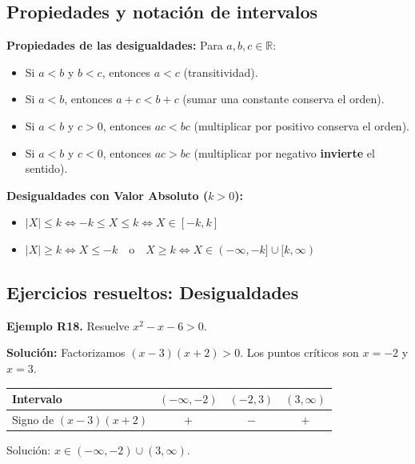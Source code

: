 \documentclass[12pt, letterpaper]{article}
\begin{document}
\subsection{Propiedades y notación de intervalos}

\begin{cuadroteoria}
      \textbf{Propiedades de las desigualdades:} Para $a, b, c \in \mathbb{R}$:
      \begin{itemize}[leftmargin=*]
            \item Si $a < b$ y $b < c$, entonces $a < c$ (transitividad).
            \item Si $a < b$, entonces $a + c < b + c$ (sumar una constante conserva el orden).
            \item Si $a < b$ y $c > 0$, entonces $ac < bc$ (multiplicar por positivo conserva el orden).
            \item Si $a < b$ y \textbf{$c < 0$}, entonces \textbf{$ac > bc$} (multiplicar por negativo \textbf{invierte} el sentido).
      \end{itemize}

      \textbf{Desigualdades con Valor Absoluto ($k > 0$):}
      \begin{itemize}[leftmargin=*]
            \item $|X| \le k \iff -k \le X \le k \iff X \in [-k, k]$
            \item $|X| \ge k \iff X \le -k \quad\text{o}\quad X \ge k \iff X \in (-\infty, -k] \cup [k, \infty)$
      \end{itemize}
\end{cuadroteoria}

\subsection{Ejercicios resueltos: Desigualdades}

\textbf{Ejemplo R18.} Resuelve $x^2 - x - 6 > 0$.

\begin{cuadrosolucion}
      \textbf{Solución:}
      Factorizamos $(x - 3)(x + 2) > 0$. Los puntos críticos son $x = -2$ y $x = 3$.
      \begin{center}
            \small
            \begin{tabular}{lccc}
                  \toprule
                  \textbf{Intervalo}        & $(-\infty, -2)$ & $(-2, 3)$ & $(3, \infty)$ \\
                  \midrule
                  Signo de $(x - 3)(x + 2)$ & $+$             & $-$       & $+$           \\
                  \bottomrule
            \end{tabular}
      \end{center}
      Solución: $x \in (-\infty, -2) \cup (3, \infty)$.
\end{cuadrosolucion}
\end{document}
